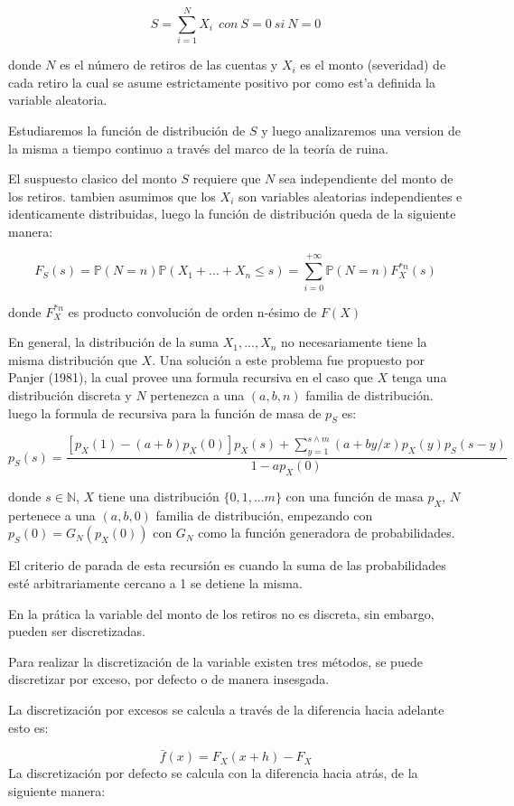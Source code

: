 \documentclass[10pt,]{article}
\begin{document}
\[S=\sum_{i=1}^{N}X_i~~con~S=0 ~si~N=0\]

donde \(N\) es el número de retiros de las cuentas y \(X_i\) es el monto
(severidad) de cada retiro la cual se asume estrictamente positivo por
como est'a definida la variable aleatoria.

Estudiaremos la función de distribución de \(S\) y luego analizaremos
una version de la misma a tiempo continuo a través del marco de la
teoría de ruina.

El suspuesto clasico del monto \(S\) requiere que \(N\) sea
independiente del monto de los retiros. tambien asumimos que los \(X_i\)
son variables aleatorias independientes e identicamente distribuidas,
luego la función de distribución queda de la siguiente manera:

\[F_{S}(s)=\mathbb{P}(N=n)\mathbb{P}(X_1+...+X_n\leq s)=\sum_{i=0}^{+\infty}\mathbb{P}(N=n)F_{X}^{*n}(s)\]

donde \(F_{X}^{*n}\) es producto convolución de orden n-ésimo de
\(F(X)\)

En general, la distribución de la suma \(X_1, ..., X_n\) no
necesariamente tiene la misma distribución que \(X\). Una solución a
este problema fue propuesto por Panjer (1981), la cual provee una
formula recursiva en el caso que \(X\) tenga una distribución discreta y
\(N\) pertenezca a una \((a,b,n)\) familia de distribución. luego la
formula de recursiva para la función de masa de \(p_S\) es:

\[p_S(s)=\frac{[p_X(1)-(a+b)p_X(0)]p_X(s)+\sum_{y=1}^{s\wedge m}(a+by/x)p_X(y)p_S(s-y)}{1-ap_X(0)}\]

donde \(s \in \mathbb{N}\), \(X\) tiene una distribución
\(\{0,1,...m\}\) con una función de masa \(p_X\), \(N\) pertenece a una
\((a,b,0)\) familia de distribución, empezando con
\(p_S(0)=G_N(p_X(0))\) con \(G_N\) como la función generadora de
probabilidades.

El criterio de parada de esta recursión es cuando la suma de las
probabilidades esté arbitrariamente cercano a 1 se detiene la misma.

En la prática la variable del monto de los retiros no es discreta, sin
embargo, pueden ser discretizadas.

Para realizar la discretización de la variable existen tres métodos, se
puede discretizar por exceso, por defecto o de manera insesgada.

La discretización por excesos se calcula a través de la diferencia hacia
adelante esto es:

\[\bar{f}(x)=F_X(x+h)-F_X\] La discretización por defecto se calcula con
la diferencia hacia atrás, de la siguiente manera:
\end{document}
